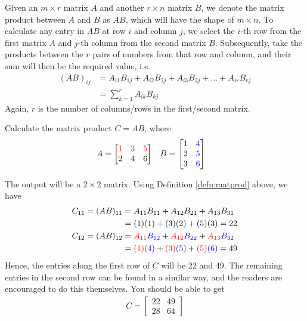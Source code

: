 \begin{defn}
\label{defn:matprod}
Given an $m \times r$ matrix $A$ and another $r \times n$ matrix $B$, we denote the matrix product between $A$ and $B$ as $AB$, which will have the shape of $m \times n$. To calculate any entry in $AB$ at row $i$ and column $j$, we select the $i$-th row from the first matrix $A$ and $j$-th column from the second matrix $B$. Subsequently, take the products between the $r$ pairs of numbers from that row and column, and their sum will then be the required value, i.e.\
\begin{subequations}
\begin{align}
(AB)_{ij} &= A_{i1}B_{1j} + A_{i2}B_{2j} + A_{i3}B_{3j} + ... + A_{ir}B_{rj} \\
&= \sum_{k=1}^{r} A_{ik}B_{kj}
\end{align}    
\end{subequations}
Again, $r$ is the number of columns/rows in the first/second matrix.
\end{defn}
\begin{exmp}
Calculate the matrix product $C = AB$, where
\begin{align*}
& A = 
\begin{bmatrix}
\mathcolor{red}{1} & \mathcolor{red}{3} & \mathcolor{red}{5} \\
2 & 4 & 6 
\end{bmatrix} &
& B = 
\begin{bmatrix}
1 & \mathcolor{blue}{4} \\
2 & \mathcolor{blue}{5} \\
3 & \mathcolor{blue}{6}
\end{bmatrix}
\end{align*}
\end{exmp}
\begin{solution}
The output will be a $2 \times 2$ matrix. Using Definition \ref{defn:matprod} above, we have
\begin{align*}
C_{11} = (AB)_{11} &= A_{11}B_{11} + A_{12}B_{21} + A_{13}B_{31} \\
&= (1)(1) + (3)(2) + (5)(3) = 22 \\
C_{12} = (AB)_{12} &= \textcolor{red}{A_{11}}\textcolor{blue}{B_{12}} + \textcolor{red}{A_{12}}\textcolor{blue}{B_{22}} + \textcolor{red}{A_{13}}\textcolor{blue}{B_{32}} \\
&= \textcolor{red}{(1)}\textcolor{blue}{(4)} + \textcolor{red}{(3)}\textcolor{blue}{(5)} + \textcolor{red}{(5)}\textcolor{blue}{(6)} = 49
\end{align*}
Hence, the entries along the first row of $C$ will be 22 and 49. The remaining entries in the second row can be found in a similar way, and the readers are encouraged to do this themselves. You should be able to get
\begin{align*}
C = 
\begin{bmatrix}
22 & 49 \\
28 & 64
\end{bmatrix}   
\end{align*}
\end{solution}

